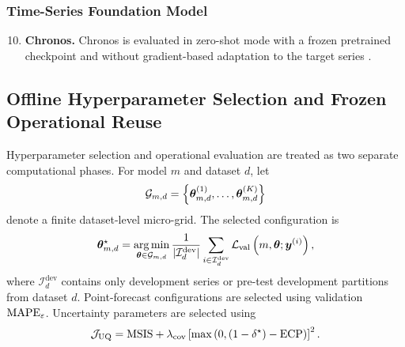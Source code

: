 \documentclass[review,number,sort&compress]{elsarticle}
\begin{document}
\subsubsection{Time-Series Foundation Model}

\begin{enumerate}
    \setcounter{enumi}{9}

    \item \textbf{Chronos.}
    Chronos is evaluated in zero-shot mode with a frozen pretrained checkpoint
    and without gradient-based adaptation to the target series
    \citep{ansari2024chronos}.
\end{enumerate}


\subsection{Offline Hyperparameter Selection and Frozen Operational Reuse}
\label{subsec:hpo}

Hyperparameter selection and operational evaluation are treated as two separate
computational phases.
For model $m$ and dataset $d$, let
\begin{equation}
    \mathcal{G}_{m,d}
    =
    \left\{
    \bm{\theta}_{m,d}^{(1)},
    \ldots,
    \bm{\theta}_{m,d}^{(K)}
    \right\}
\end{equation}
denote a finite dataset-level micro-grid. The selected configuration is
\begin{equation}
    \bm{\theta}_{m,d}^{\star}
    =
    \operatorname*{arg\,min}_{
    \bm{\theta}\in\mathcal{G}_{m,d}
    }
    \frac{1}{|\mathcal{I}_{d}^{\mathrm{dev}}|}
    \sum_{i\in\mathcal{I}_{d}^{\mathrm{dev}}}
    \mathcal{L}_{\mathrm{val}}
    \left(
    m,\bm{\theta};\bm{y}^{(i)}
    \right),
    \label{eq:dataset_hpo}
\end{equation}
where $\mathcal{I}_{d}^{\mathrm{dev}}$ contains only development series or
pre-test development partitions from dataset $d$.
Point-forecast configurations are selected using validation
$\mathrm{MAPE}_{\varepsilon}$. Uncertainty parameters are selected using
\begin{equation}
    \mathcal{J}_{\mathrm{UQ}}
    =
    \mathrm{MSIS}
    +
    \lambda_{\mathrm{cov}}
    \left[
    \max
    \left(
    0,
    (1-\delta^\star)-\mathrm{ECP}
    \right)
    \right]^2.
    \label{eq:uq_hpo_objective}
\end{equation}
\end{document}
